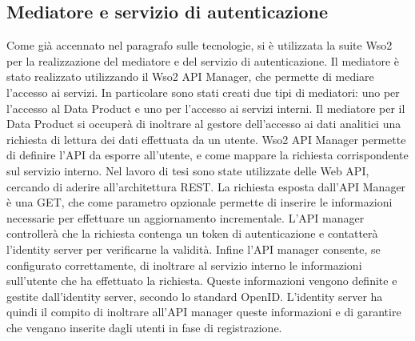 \documentclass[a4paper,12pt]{report}
\begin{document}
\subsection{Mediatore e servizio di autenticazione}
Come già accennato nel paragrafo sulle tecnologie, si è utilizzata la suite Wso2 per la realizzazione del mediatore e del servizio di autenticazione.
Il mediatore è stato realizzato utilizzando il Wso2 API Manager, che permette di mediare l'accesso ai servizi.
In particolare sono stati creati due tipi di mediatori: uno per l'accesso al Data Product e uno per l'accesso ai servizi interni.
Il mediatore per il Data Product si occuperà di inoltrare al gestore dell'accesso ai dati analitici una richiesta di lettura dei dati effettuata da un utente.
Wso2 API Manager permette di definire l'API da esporre all'utente, e come mappare la richiesta corrispondente sul servizio interno. 
Nel lavoro di tesi sono state utilizzate delle Web API, cercando di aderire all'architettura REST.
La richiesta esposta dall'API Manager è una GET, che come parametro opzionale permette di inserire le informazioni necessarie per effettuare un aggiornamento incrementale.
L'API manager controllerà che la richiesta contenga un token di autenticazione e contatterà l'identity server per verificarne la validità.
Infine l'API manager consente, se configurato correttamente, di inoltrare al servizio interno le informazioni sull'utente che ha effettuato la richiesta. 
Queste informazioni vengono definite e gestite dall'identity server, secondo lo standard OpenID.
L'identity server ha quindi il compito di inoltrare all'API manager queste informazioni e di garantire che vengano inserite dagli utenti in fase di registrazione.
\end{document}
